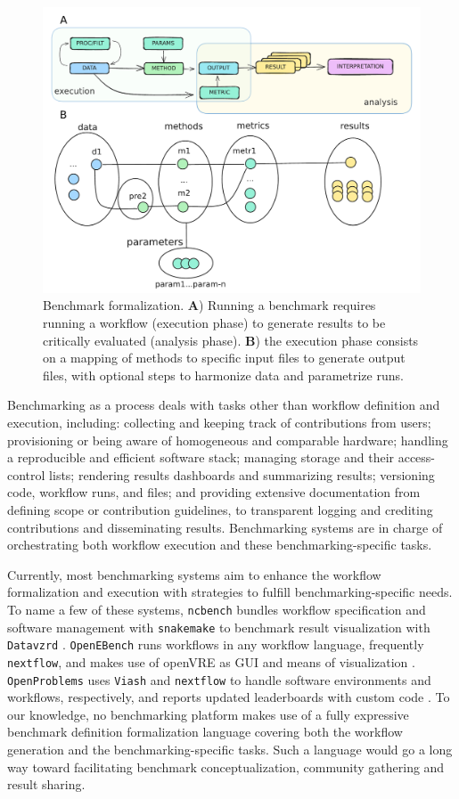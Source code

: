 \documentclass[11pt]{article}
\begin{document}
\begin{figure}
    \centering
    \includegraphics[width=0.75\linewidth]{figures/bens_formalization.pdf}
    \caption[Benchmark formalization.]{Benchmark formalization. \textbf{A}) Running a benchmark requires running a workflow (execution phase) to generate results to be critically evaluated (analysis phase). \textbf{B}) the execution phase consists on a mapping of methods to specific input files to generate output files, with optional steps to harmonize data and parametrize runs.}
    \label{fig:formalization}
\end{figure}

Benchmarking as a process deals with tasks other than workflow definition and execution, including: collecting and keeping track of contributions from users; provisioning or being aware of homogeneous and comparable hardware; handling a reproducible and efficient software stack; managing storage and their access-control lists; rendering results dashboards and summarizing results; versioning code, workflow runs, and files; and providing extensive documentation from defining scope or contribution guidelines, to transparent logging and crediting contributions and disseminating results. Benchmarking systems are in charge of orchestrating both workflow execution and these benchmarking-specific tasks.

Currently, most benchmarking systems aim to enhance the workflow formalization and execution with strategies to fulfill benchmarking-specific needs. To name a few of these systems, \texttt{ncbench} bundles workflow specification and software management with \texttt{snakemake} to benchmark result visualization with \texttt{Datavzrd} \cite{Hanssen2023-uf}. \texttt{OpenEBench} runs workflows in any workflow language, frequently \texttt{nextflow}, and makes use of openVRE as GUI and means of visualization \cite{Capella-Gutierrez2017-dh}. \texttt{OpenProblems} uses \texttt{Viash} and \texttt{nextflow} to handle software environments and workflows, respectively, and reports updated leaderboards with custom code \cite{Luecken2024-fk}. To our knowledge, no benchmarking platform makes use of a fully expressive benchmark definition formalization language covering both the workflow generation and the benchmarking-specific tasks. Such a language would go a long way toward facilitating benchmark conceptualization, community gathering and result sharing.
\end{document}

